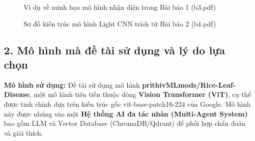 \documentclass[12pt,a4paper]{article}
\begin{document}
\begin{figure}[htbp]
    \centering
    \caption{Ví dụ về minh họa mô hình nhận diện trong Bài báo 1 (b3.pdf)}
    \label{fig:b3_image}
\end{figure}

\begin{figure}[htbp]
    \centering
    \caption{Sơ đồ kiến trúc mô hình Light CNN trích từ Bài báo 2 (b4.pdf)}
    \label{fig:b4_image}
\end{figure}

\subsection{2. Mô hình mà đề tài sử dụng và lý do lựa chọn}

\textbf{Mô hình sử dụng:} 
Đề tài sử dụng mô hình \textbf{prithivMLmods/Rice-Leaf-Disease}, một mô hình tiên tiến thuộc dòng \textbf{Vision Transformer (ViT)}, cụ thể được tinh chỉnh dựa trên kiến trúc gốc vit-base-patch16-224 của Google. Mô hình này được nhúng vào một \textbf{Hệ thống AI đa tác nhân (Multi-Agent System)} bao gồm LLM và Vector Database (ChromaDB/Qdrant) để phối hợp chẩn đoán và giải thích.
\end{document}
